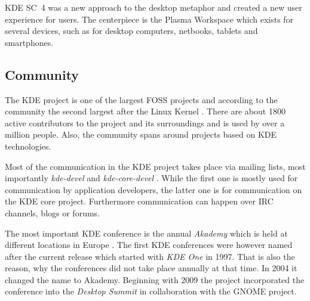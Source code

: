 \ac{KDE SC}~4 was a new approach to the desktop metaphor and created a new user
experience for users. The centerpiece is the Plasma Workspace which exists for
several devices, such as for desktop computers, netbooks, tablets and
smartphones.


\subsection{Community} %

The KDE project is one of the largest \ac{FOSS} projects and according to the
community the second largest after the Linux Kernel \cite{KDEPress}. There are
about 1800 active contributors to the project and its surroundings and is used
by over a million people. Also, the community spans around projects based on
KDE technologies.

Most of the communication in the KDE project takes place via mailing lists,
most importantly \emph{kde-devel} and \emph{kde-core-devel}
\cite{KDEProjectManagement,KDEContribute}. While the first one is mostly used
for communication by application developers, the latter one is for
communication on the KDE core project. Furthermore communication can happen
over \ac{IRC} channels, blogs or forums.

The most important KDE conference is the annual \emph{Akademy} which is held at
different locations in Europe \cite{KDEHistory}. The first KDE conferences were
however named after the current release which started with \emph{KDE One} in
1997. That is also the reason, why the conferences did not take place annually
at that time. In 2004 it changed the name to Akademy. Beginning with 2009 the
project incorporated the conference into the \emph{Desktop Summit} in
collaboration with the GNOME project.

